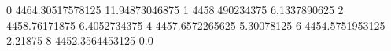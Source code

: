 0 4464.30517578125 11.94873046875
1 4458.490234375 6.1337890625
2 4458.76171875 6.4052734375
4 4457.6572265625 5.30078125
6 4454.5751953125 2.21875
8 4452.3564453125 0.0
